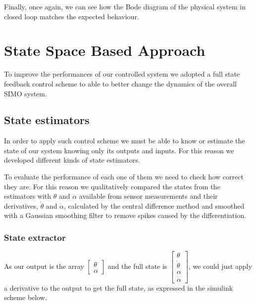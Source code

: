 
Finally, once again, we can see how the Bode diagram of the physical system in closed loop matches the expected behaviour.

\section{State Space Based Approach}

To improve the performances of our controlled system we adopted a full state feedback control scheme to able to better change the dynamics of the overall SIMO system.

\subsection{State estimators}

In order to apply such control scheme we must be able to know or estimate the state of our system knowing only its outputs and inputs. For this reason we developed different kinds of state estimators.

To evaluate the performance of each one of them we need to check how correct they are. For this reason we qualitatively compared the states from the estimators with $\theta$ and $\alpha$ available from sensor measurements and their derivatives, $\dot\theta$ and $\dot\alpha$, calculated by the central difference method and smoothed with a Gaussian smoothing filter to remove spikes caused by the differentiation.

\subsubsection{State extractor}

As our output is the array 
$\begin{bmatrix}
    \theta \\
    \alpha
\end{bmatrix}$
and the full state is 
$\begin{bmatrix}
    \theta \\
    \dot\theta \\
    \alpha \\
    \dot\alpha 
\end{bmatrix}$,
we could just apply a derivative to the output to get the full state, as expressed in the simulink scheme below.


